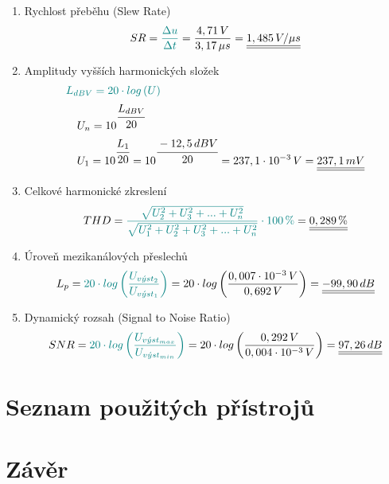 \documentclass[a4paper, czech]{article}
\begin{document}
\begin{enumerate}
    \item Rychlost přeběhu (Slew Rate)
    \begin{multline*}
        SR = \textcolor{teal}{\frac{\Delta u}{\Delta t}} = \frac{4,71 \, V}{3,17 \, \mu s} = \underline{\underline{1,485 \, V / \mu s}} \hfill
    \end{multline*}

    \item Amplitudy vyšších harmonických složek
    \begin{multline*}
        \textcolor{teal}{L_{dBV} = 20 \cdot log \left( U \right)} \hfill \\
        \ \ \ U_n = 10^{\cfrac{L_{dBV}}{20}} \hfill \\
        \ \ \ U_1 = 10^{\cfrac{L_1}{20}} = 10^{\cfrac{-12,5 \, dBV}{20}} = 237,1 \cdot 10^{-3} \, V = \underline{\underline{237,1\, mV}} \hfill
    \end{multline*}

    \item Celkové harmonické zkreslení
    \begin{multline*}
        THD = \textcolor{teal}{\frac{\sqrt{U_2^2 + U_3^2 + ... + U_n^2}}{\sqrt{U_1^2 + U_2^2 + U_3^2 + ... + U_n^2}} \cdot 100 \, \%} = \underline{\underline{0,289\, \%}} \hfill
    \end{multline*}

    \item Úroveň mezikanálových přeslechů
    \begin{multline*}
        L_p = \textcolor{teal}{20 \cdot log \left( \frac{U_{v \acute{y} st_2}}{U_{v \acute{y} st_1}} \right)} = 20 \cdot log \left( \frac{0,007 \cdot 10^{-3} \, V}{0,692 \, V} \right) = \underline{\underline{-99,90 \, dB}} \hfill
    \end{multline*}

    \item Dynamický rozsah (Signal to Noise Ratio)
    \begin{multline*}
        SNR = \textcolor{teal}{20 \cdot log \left( \frac{U_{v \acute{y} st_{max}}}{U_{v \acute{y} st_{min}}} \right)} = 20 \cdot log \left( \frac{0,292 \, V}{0,004 \cdot 10^{-3} \, V} \right) = \underline{\underline{97,26 \, dB}} \hfill
    \end{multline*}
\end{enumerate}

\section{Seznam použitých přístrojů}

\section{Závěr}
\end{document}
